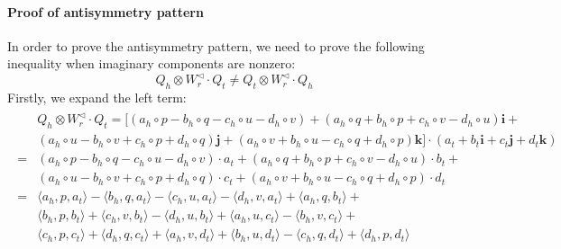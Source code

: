 \documentclass{article}
\begin{document}
\paragraph{Proof of antisymmetry pattern} In order to prove the antisymmetry pattern, we need to prove the following inequality when imaginary components are nonzero:
\begin{equation}
    Q_h \otimes W_r^{\triangleleft} \cdot Q_t \neq  Q_t \otimes W_r^{\triangleleft} \cdot Q_h
\end{equation}
Firstly, we expand the left term:
\begin{align*}
\begin{split}
    &Q_h \otimes W_r^{\triangleleft} \cdot Q_t  =
   [( a_h\circ p - b_h\circ q - c_h\circ u - d_h\circ v )  + (a_h\circ q + b_h\circ p + c_h\circ v - d_h\circ u) \textbf{i} +
   \\ &(a_h\circ u - b_h\circ v + c_h\circ p + d_h\circ q) \textbf{j} + (a_h\circ v + b_h\circ u - c_h\circ q + d_h\circ p) \textbf{k} ]  \cdot  (a_t + b_t \textbf{i} + c_t \textbf{j} + d_t \textbf{k}) \\
   = &( a_h\circ p - b_h\circ q - c_h\circ u - d_h\circ v ) \cdot a_t + (a_h\circ q + b_h\circ p + c_h\circ v - d_h\circ u) \cdot b_t +  \\
   &(a_h\circ u - b_h\circ v + c_h\circ p + d_h\circ q) \cdot c_t + (a_h\circ v + b_h\circ u - c_h\circ q + d_h\circ p) \cdot d_t \\
   = & \langle a_h, p, a_t\rangle - \langle b_h, q, a_t\rangle - \langle c_h, u, a_t\rangle - \langle d_h, v, a_t\rangle + \langle a_h, q, b_t\rangle + \\ &\langle b_h, p, b_t\rangle + \langle c_h, v, b_t\rangle - \langle d_h, u, b_t\rangle + \langle a_h, u, c_t\rangle - \langle b_h, v, c_t\rangle + \\ &\langle c_h, p, c_t\rangle + \langle d_h, q, c_t\rangle + \langle a_h, v, d_t\rangle + \langle b_h, u, d_t \rangle - \langle c_h, q, d_t \rangle + \langle d_h, p, d_t\rangle
\end{split}
\end{align*}
\end{document}
